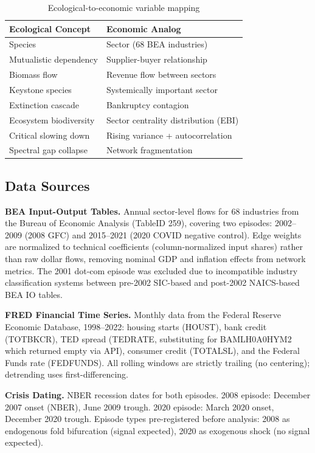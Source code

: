 \documentclass[12pt,a4paper]{article}
\begin{document}
\begin{table}[H]
\centering
\caption{Ecological-to-economic variable mapping}
\label{tab:mapping}
\begin{tabular}{ll}
\toprule
\textbf{Ecological Concept} & \textbf{Economic Analog} \\
\midrule
Species & Sector (68 BEA industries) \\
Mutualistic dependency & Supplier-buyer relationship \\
Biomass flow & Revenue flow between sectors \\
Keystone species & Systemically important sector \\
Extinction cascade & Bankruptcy contagion \\
Ecosystem biodiversity & Sector centrality distribution (EBI) \\
Critical slowing down & Rising variance + autocorrelation \\
Spectral gap collapse & Network fragmentation \\
\bottomrule
\end{tabular}
\end{table}

\subsection{Data Sources}

\textbf{BEA Input-Output Tables.} Annual sector-level flows for 68 industries from the
Bureau of Economic Analysis (TableID 259), covering two episodes: 2002--2009 (2008
GFC) and 2015--2021 (2020 COVID negative control). Edge weights are normalized to
technical coefficients (column-normalized input shares) rather than raw dollar flows,
removing nominal GDP and inflation effects from network metrics. The 2001 dot-com
episode was excluded due to incompatible industry classification systems between
pre-2002 SIC-based and post-2002 NAICS-based BEA IO tables.

\textbf{FRED Financial Time Series.} Monthly data from the Federal Reserve Economic
Database, 1998--2022: housing starts (HOUST), bank credit (TOTBKCR), TED spread
(TEDRATE, substituting for BAMLH0A0HYM2 which returned empty via API), consumer
credit (TOTALSL), and the Federal Funds rate (FEDFUNDS). All rolling windows are
strictly trailing (no centering); detrending uses first-differencing.

\textbf{Crisis Dating.} NBER recession dates for both episodes. 2008 episode: December
2007 onset (NBER), June 2009 trough. 2020 episode: March 2020 onset, December 2020
trough. Episode types pre-registered before analysis: 2008 as endogenous fold
bifurcation (signal expected), 2020 as exogenous shock (no signal expected).
\end{document}
